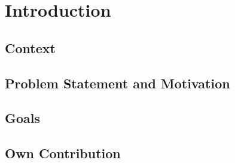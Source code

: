 \section{Introduction}\label{sec:introduction}
\subsection{Context}
\subsection{Problem Statement and Motivation}
\subsection{Goals}\label{sec:goals}
 \subsection{Own Contribution}
